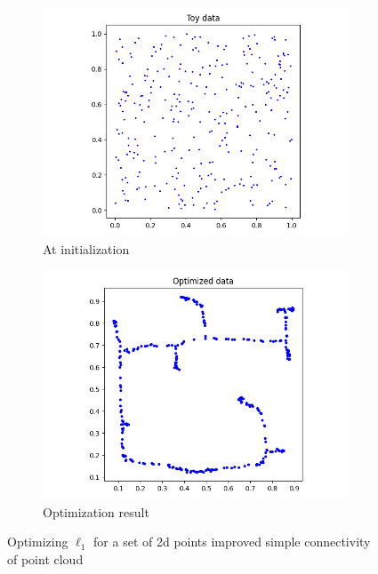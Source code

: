 \begin{figure}[h!]
    \centering
    \begin{subfigure}{.5\textwidth}
  \centering
  \includegraphics[width=\textwidth]{images/opt/toydata.png}
  \caption{At initialization}
  \label{fig:sub1}
\end{subfigure}%
\begin{subfigure}{.5\textwidth}
  \centering
  \includegraphics[width=\textwidth]{images/opt/optdata.png}
  \caption{Optimization result}
  \label{fig:sub2}
\end{subfigure}
    \caption{Optimizing $\ell_1$ for a set of 2d points improved simple connectivity of point cloud}
    \label{fig:optimizel1}
\end{figure}

